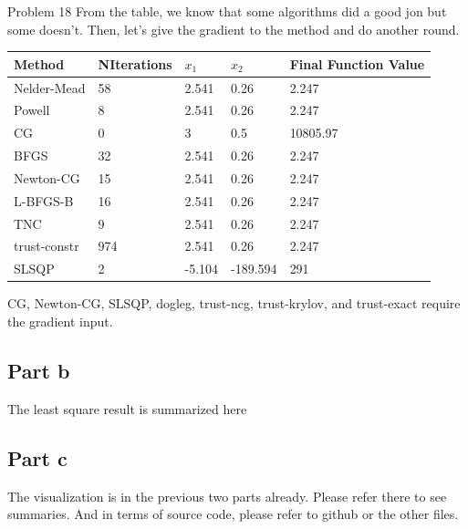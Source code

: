 \documentclass[10pt]{article}
\begin{document}
\begin{section}{Problem 18}
\vspace{10mm}
    From the table, we know that some algorithms did a good jon but some doesn't. Then, let's give the gradient to the method and do another round. 
    \vspace{5mm}
    	\begin{tabular}{lllll}
    		\hline
    		Method & NIterations & $x_1$ & $x_2$& Final Function Value \\
    		\hline\hline
			Nelder-Mead  & 58  & 2.541  & 0.26     & 2.247    \\
			Powell       & 8   & 2.541  & 0.26     & 2.247    \\
			CG           & 0   & 3      & 0.5      & 10805.97 \\
			BFGS         & 32  & 2.541  & 0.26     & 2.247    \\
			Newton-CG    & 15  & 2.541  & 0.26     & 2.247    \\
			L-BFGS-B     & 16  & 2.541  & 0.26     & 2.247    \\
			TNC          & 9   & 2.541  & 0.26     & 2.247    \\
			trust-constr & 974 & 2.541  & 0.26     & 2.247    \\
			SLSQP        & 2   & -5.104 & -189.594 & 291   
    	 \end{tabular}

	CG, Newton-CG, SLSQP, dogleg, trust-ncg, trust-krylov, and trust-exact require the gradient input. 
	\subsection{Part b}
	The least square result is summarized here 
	
	\subsection{Part c}
	The visualization is in the previous two parts already. Please refer there to see summaries. And in terms of source code, please refer to github or the other files. 
\end{section}
\end{document}
